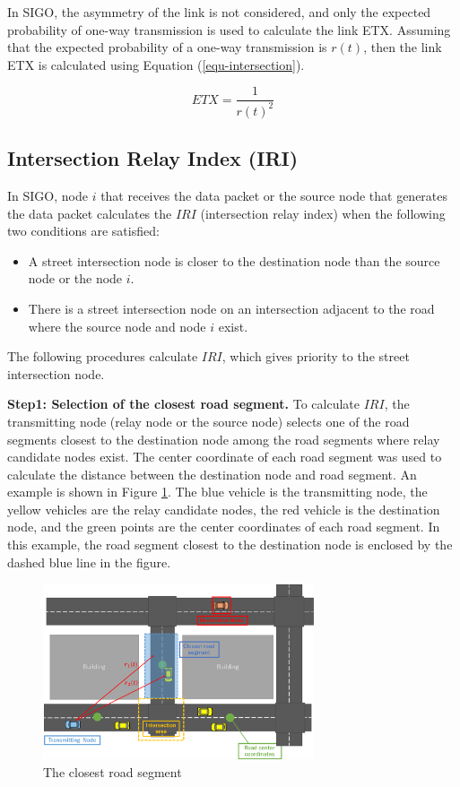 \documentclass[conference]{IEEEtran}
\begin{document}
In SIGO, the asymmetry of the link is not considered, and only the expected probability of one-way transmission is used to calculate the link ETX. 
Assuming that the expected probability of a one-way transmission is $r(t)$, then the link ETX is calculated using Equation (\ref{equ-intersection}).
 
 \begin{equation}
 \label{equ-intersection}
 ETX = \frac{1}{  {r(t)}^{2}   } 
 \end{equation}


\subsection{Intersection Relay Index (IRI)}

In SIGO, node $i$ that receives the data packet or the  source node that generates the data packet calculates the 
$IRI$ (intersection relay index) when the following two conditions are satisfied:
\begin{itemize}
\item A street intersection node is closer to the destination node than the source node or the node $i$.
\item There is a street intersection node on an intersection adjacent to the road where the source node and node $i$ exist.
\end{itemize}

The following procedures calculate $IRI$, which gives priority to  the street intersection node.

\textbf{Step1: Selection of the closest road segment.}
To calculate $IRI$, the transmitting node (relay node or the source node) selects one of the road segments closest to the destination node among the road segments where relay candidate nodes exist.
The center coordinate of each road segment was used to calculate the distance between the destination node and road segment. An example is shown in Figure \ref{fig:closest_road}.
The blue vehicle is the transmitting node, the yellow vehicles are the relay candidate nodes, the red vehicle is the destination node, and the green points are the center coordinates of each road segment. In this example, the road segment closest to the destination node is  enclosed by the dashed blue line in the figure.

\begin{figure}[!ht]
\centering
\includegraphics[width=80mm]{figures/closest_road.eps}
\caption{The closest road segment}
\label{fig:closest_road}
\end{figure}
\end{document}
